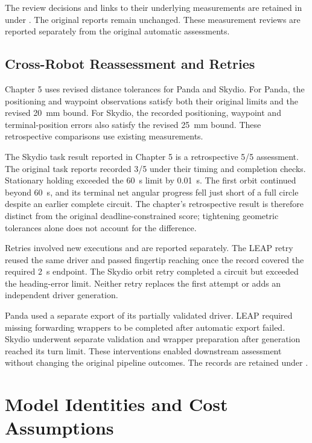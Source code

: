The review decisions and links to their underlying measurements are retained
in  under
.
The original reports remain unchanged.
These measurement reviews are reported separately from the original
automatic assessments.

\subsection{Cross-Robot Reassessment and Retries}
\label{sec:appendix-cross-robot-review}

Chapter 5 uses revised distance tolerances for Panda and Skydio.
For Panda, the positioning and waypoint observations satisfy both their
original limits and the revised 20~mm bound.
For Skydio, the recorded positioning, waypoint and terminal-position errors
also satisfy the revised 25~mm bound. These retrospective comparisons use
existing measurements.

The Skydio task result reported in Chapter 5 is a retrospective 5/5
assessment. The original task reports recorded 3/5 under their timing
and completion checks. Stationary holding exceeded the 60~s limit by
0.01~s. The first orbit continued beyond 60~s, and its terminal net
angular progress fell just short of a full circle despite an earlier
complete circuit. The chapter's retrospective result is therefore distinct
from the original deadline-constrained score; tightening geometric tolerances
alone does not account for the difference.

Retries involved new executions and are reported separately.
The LEAP retry reused the same driver and passed fingertip reaching once
the record covered the required 2~s endpoint. The Skydio orbit retry
completed a circuit but exceeded the heading-error limit.
Neither retry replaces the first attempt or adds an independent driver
generation.

Panda used a separate export of its partially validated driver.
LEAP required missing forwarding wrappers to be completed after automatic
export failed. Skydio underwent separate validation and wrapper preparation
after generation reached its turn limit.
These interventions enabled downstream assessment without changing the
original pipeline outcomes. The records are retained under
.

\section{Model Identities and Cost Assumptions}
\label{sec:appendix-models}

